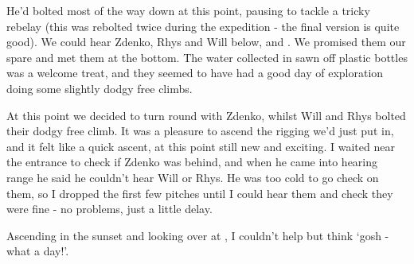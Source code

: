 He’d bolted most of the way down at this point, pausing to tackle a tricky rebelay (this was rebolted twice during the expedition - the final version is quite good). We could hear Zdenko, Rhys and Will below, and . We promised them our spare and met them at the bottom. The water collected in sawn off plastic bottles was a welcome treat, and they seemed to have had a good day of exploration doing some slightly dodgy free climbs.

At this point we decided to turn round with Zdenko, whilst Will and Rhys bolted their dodgy free climb. It was a pleasure to ascend the rigging we’d just put in, and it felt like a quick ascent, at this point still new and exciting. I waited near the entrance to check if Zdenko was behind, and when he came into hearing range he said he couldn’t hear Will or Rhys. He was too cold to go check on them, so I dropped the first few pitches until I could hear them and check they were fine - no problems, just a little delay.

Ascending in the sunset and looking over at , I couldn’t help but think ‘gosh - what a day!’.


